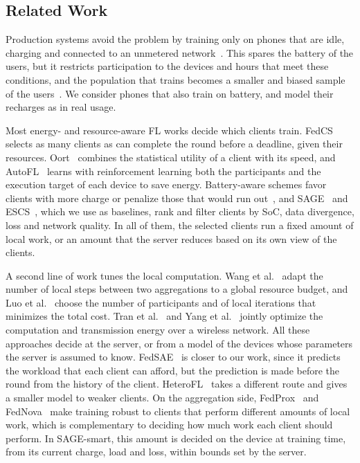 \subsection{Related Work}\label{sec:related}

Production systems avoid the problem by training only on phones that are idle,
charging and connected to an unmetered network~\cite{bonawitz2019towards,hard2018gboard}.
This spares the battery of the users, but it restricts participation to the
devices and hours that meet these conditions, and the population that trains
becomes a smaller and biased sample of the users~\cite{yang2021heterogeneity}.
We consider phones that also train on battery, and model their recharges as in
real usage.

Most energy- and resource-aware FL works decide which clients train.
FedCS~\cite{nishio2019fedcs} selects as many clients as can complete the round
before a deadline, given their resources. Oort~\cite{lai2021oort} combines the
statistical utility of a client with its speed, and AutoFL~\cite{kim2021autofl}
learns with reinforcement learning both the participants and the execution
target of each device to save energy. Battery-aware schemes favor clients with
more charge or penalize those that would run out~\cite{arouj2022eafl,albelaihi2022greenfl,augello2025batteryfl},
and SAGE~\cite{savoia2026sage} and ESCS~\cite{maciel2024escs}, which we use as
baselines, rank and filter clients by SoC, data divergence, loss and network
quality. In all of them, the selected clients run a fixed amount of local work,
or an amount that the server reduces based on its own view of the clients.

A second line of work tunes the local computation. Wang et
al.~\cite{wang2019adaptive} adapt the number of local steps between two
aggregations to a global resource budget, and Luo et al.~\cite{luo2021cost}
choose the number of participants and of local iterations that minimizes the
total cost. Tran et al.~\cite{tran2019wireless} and Yang et
al.~\cite{yang2021energy} jointly optimize the computation and transmission
energy over a wireless network. All these approaches decide at the server, or
from a model of the devices whose parameters the server is assumed to know.
FedSAE~\cite{li2021fedsae} is closer to our work, since it predicts the
workload that each client can afford, but the prediction is made before the
round from the history of the client. HeteroFL~\cite{diao2021heterofl} takes a
different route and gives a smaller model to weaker clients. On the
aggregation side, FedProx~\cite{li2020fedprox} and FedNova~\cite{wang2020fednova}
make training robust to clients that perform different amounts of local work,
which is complementary to deciding how much work each client should perform.
In SAGE-smart, this amount is decided on the device at training time, from its
current charge, load and loss, within bounds set by the server.

